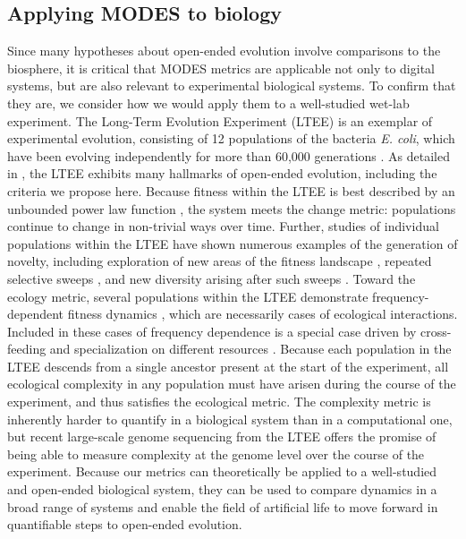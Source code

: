 \documentclass[letterpaper]{article}
\begin{document}
\subsection{Applying MODES to biology}

Since many hypotheses about open-ended evolution involve comparisons to the biosphere, it is critical that MODES metrics are applicable not only to digital systems, but are also relevant to experimental biological systems. To confirm that they are, we consider how we would apply them to a well-studied wet-lab experiment. The Long-Term Evolution Experiment (LTEE) \citep{lenski_long-term_1991} is an exemplar of experimental evolution, consisting of 12 populations of the bacteria \textit{E. coli}, which have been evolving independently for more than 60,000 generations \citep{good_dynamics_2017}.  As detailed in \citep{taylor_open-ended_2016}, the LTEE exhibits many hallmarks of open-ended evolution, including the criteria we propose here.  Because fitness within the LTEE is best described by an unbounded power law function \citep{wiser_long-term_2013,lenski_sustained_2015}, the system meets the change metric: populations continue to change in non-trivial ways over time.  Further, studies of individual populations within the LTEE have shown numerous examples of the generation of novelty, including exploration of new areas of the fitness landscape \citep{tenaillon_tempo_2016}, repeated selective sweeps \citep{maddamsetti_adaptation_2015}, and new diversity arising after such sweeps \citep{blount_genomic_2012}.   Toward the ecology metric, several populations within the LTEE demonstrate frequency-dependent fitness dynamics \citep{ribeck_modeling_2015,rozen_long-term_2000,le_gac_ecological_2012,maddamsetti_adaptation_2015}, which are necessarily cases of ecological interactions.  Included in these cases of frequency dependence is a special case \citep{blount_historical_2008,blount_genomic_2012,turner_replaying_2015} driven by cross-feeding and specialization on different resources \citep{turner_evolution_2015}.  Because each population in the LTEE descends from a single ancestor present at the start of the experiment, all ecological complexity in any population must have arisen during the course of the experiment, and thus satisfies the  ecological metric.  The complexity metric is inherently harder to quantify in a biological system than in a computational one, but recent large-scale genome sequencing from the LTEE \citep{tenaillon_tempo_2016} offers the promise of being able to measure complexity at the genome level over the course of the experiment. Because our metrics can theoretically be applied to a well-studied and open-ended biological system, they can be used to compare dynamics in a broad range of systems and enable the field of artificial life to move forward in quantifiable steps to open-ended evolution.
\end{document}

